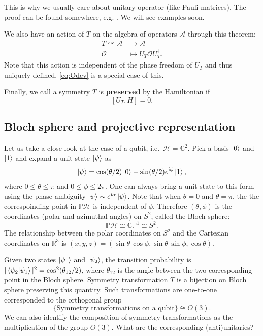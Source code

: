\documentclass[
]{scrartcl}
\numberwithin{equation}{section}
\renewenvironment{align}{\begin{equation}\begin{aligned}}{\end{aligned}\end{equation}}
\theoremstyle{definition}
\theoremstyle{definition}
\theoremstyle{definition}
\theoremstyle{definition}
\theoremstyle{remark}
\begin{document}
This is why we usually care about unitary operator (like Pauli matrices).
The proof can be found somewhere, e.g. \textcite{Weinberg:1995mt}. We will see examples soon.

We also have an action of \(T\) on the algebra of operators \(\mathcal{A}\) through this theorem:
\begin{align}
  \label{eq:TonA}
  T \curvearrowright \mathcal{A}  & \to \mathcal{A} \\
  \mathcal{O} & \mapsto U_T \mathcal{O} U^\dagger_T.
\end{align}
Note that this action is independent of the phase freedom of \(U_T\) and thus uniquely defined.
\eqref{eq:Odev} is a special case of this.

Finally, we call a symmetry \(T\) is \textbf{preserved} by the Hamiltonian if
\begin{equation}
  \label{eq:UHcommute}
  [U_T,H] = 0.
\end{equation}

\hypertarget{Bloch}{%
\subsection{Bloch sphere and projective representation}\label{Bloch}}

Let us take a close look at the case of a qubit, i.e.~\(\mathcal{H} = \mathbb{C}^2\).
Pick a basis \(\ket{0}\) and \(\ket{1}\) and expand a unit state \(\ket{\psi}\) as
\begin{equation}
  \label{eq:psiexp}
  \ket{\psi} = \cos(\theta/2) \ket{0} + \sin(\theta/2)e^{\mathrm{i}\phi} \ket{1},
\end{equation}
where \(0\le \theta \le \pi\) and \(0 \le \phi \le 2\pi\).
One can always bring a unit state to this form using the phase ambiguity \(\ket{\psi}\sim e^{\mathrm{i}\alpha}\ket{\psi}\).
Note that when \(\theta = 0\) and \(\theta =\pi\), the the correspoinding point in \(\mathbb{P}\mathcal{H}\) is independent of \(\phi\). Therefore \((\theta,\phi)\) is the coordinates (polar and azimuthal angles) on \(S^2\), called the Bloch sphere:
\begin{equation}
  \label{eq:PHCP1}
  \mathbb{P}\mathcal{H} \cong \mathbb{CP}^1 \cong S^2.
\end{equation}
The relationship between the polar coordinates on \(S^2\) and the Cartesian coordinates on \(\mathbb{R}^3\) is \((x,y,z) = (\sin\theta\,\cos\phi,\sin\theta\,\sin\phi,\cos\theta)\).

Given two states \(\ket{\psi_1}\) and \(\ket{\psi_2}\), the transition probability is \(|\braket{\psi_2|\psi_1}|^2 = \cos^2(\theta_{12}/2)\), where \(\theta_{12}\) is the angle between the two corresponding point in the Bloch sphere.
Symmetry transformation \(T\) is a bijection on Bloch sphere preserving this quantity. Such transformations are one-to-one corresponded to the orthogonal group
\begin{equation}
  \label{eq:TisO3}
  \{\text{Symmetry transformations on a qubit}\} \cong O(3).
\end{equation}
We can also identify the composition of symmetry transformations as the multiplication of the group \(O(3)\).
What are the corresponding (anti)unitaries?
\end{document}
